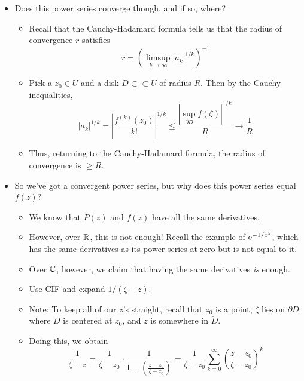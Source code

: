 \documentclass[../notes.tex]{subfiles}
\begin{document}
\begin{itemize}
\begin{itemize}
\begin{itemize}
        \end{itemize}
        \item Does this power series converge though, and if so, where?
        \begin{itemize}
            \item Recall that the Cauchy-Hadamard formula tells us that the radius of convergence $r$ satisfies
            \begin{equation*}
                r = \left( \limsup_{k\to\infty}|a_k|^{1/k} \right)^{-1}
            \end{equation*}
            \item Pick a $z_0\in U$ and a disk $D\subset\subset U$ of radius $R$. Then by the Cauchy inequalities,
            \begin{equation*}
                |a_k|^{1/k} = \left| \frac{f^{(k)}(z_0)}{k!} \right|^{1/k}
                \leq \frac{|\sup_{\partial D}f(\zeta)|^{1/k}}{R}
                \to \frac{1}{R}
            \end{equation*}
            \item Thus, returning to the Cauchy-Hadamard formula, the radius of convergence is $\geq R$.
        \end{itemize}
        \item So we've got a convergent power series, but why does this power series equal $f(z)$?
        \begin{itemize}
            \item We know that $P(z)$ and $f(z)$ have all the same derivatives.
            \item However, over $\R$, this is not enough! Recall the example of $\e[-1/x^2]$, which has the same derivatives as its power series at zero but is not equal to it.
            \item Over $\C$, however, we claim that having the same derivatives \emph{is} enough.
            \item Use CIF and expand $1/(\zeta-z)$.
            \item Note: To keep all of our $z$'s straight, recall that $z_0$ is a point, $\zeta$ lies on $\partial D$ where $D$ is centered at $z_0$, and $z$ is somewhere in $\mathring{D}$.
            \item Doing this, we obtain
            \begin{equation*}
                \frac{1}{\zeta-z} = \frac{1}{\zeta-z_0}\cdot\frac{1}{1-\left( \frac{z-z_0}{\zeta-z_0} \right)}
                = \frac{1}{\zeta-z_0}\sum_{k=0}^\infty\left( \frac{z-z_0}{\zeta-z_0} \right)^k

\end{equation*}
\end{itemize}
\end{itemize}
\end{itemize}
\end{document}
